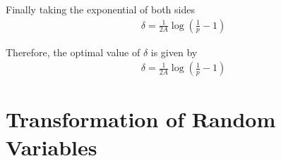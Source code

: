 \documentclass[12pt]{book}
\newcommand{\solution}{\noindent \textbf{Solution: }}
\begin{document}
\begin{enumerate}
Finally taking the exponential of both sides
\begin{align*}
\delta = \frac{1}{2A}\log\left(\frac{1}{p}-1\right)
\end{align*}

Therefore, the optimal value of $\delta$  is given by  
\begin{align*}
\delta = \frac{1}{2A}\log\left(\frac{1}{p}-1\right)
\end{align*}

\end{enumerate}

\chapter{Transformation of Random Variables}
\end{document}
